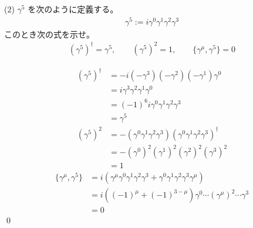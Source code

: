 \documentclass[uplatex,dvipdfmx,a4paper,11pt]{jlreq}
\makeatletter
\theoremstyle{definition}
\renewenvironment{proof}[1][\proofname]{\par
  \normalfont
  \topsep6\p@\@plus6\p@ \trivlist
  \item[\hskip\labelsep{\bfseries #1}\@addpunct{\bfseries}]\ignorespaces\quad\par
}{%
  \qed\endtrivlist\@endpefalse
}
\renewcommand\proofname{証明}
\makeatother
\begin{document}
(2) $\gamma^5$ を次のように定義する。
\begin{align}
  \gamma^5 := i\gamma^0\gamma^1\gamma^2\gamma^3
\end{align}
このとき次の式を示せ。
\begin{align}
  (\gamma^5)^\dagger = \gamma^5, \qquad (\gamma^5)^2 = 1, \qquad \lbrace\gamma^\mu, \gamma^5\rbrace = 0
\end{align}
\begin{proof}
  \begin{align}
    (\gamma^5)^\dagger & = -i(-\gamma^3)(-\gamma^2)(-\gamma^1)\gamma^0                                   \\
                       & = i\gamma^3\gamma^2\gamma^1\gamma^0                                             \\
                       & = (-1)^6i\gamma^0\gamma^1\gamma^2\gamma^3                                       \\
                       & = \gamma^5                                                                      \\
    (\gamma^5)^2       & = -(\gamma^0\gamma^1\gamma^2\gamma^3)(\gamma^0\gamma^1\gamma^2\gamma^3)^\dagger \\
                       & = - (\gamma^0)^2(\gamma^1)^2(\gamma^2)^2(\gamma^3)^2                            \\
                       & = 1
  \end{align}
  \begin{align}
    \lbrace\gamma^\mu, \gamma^5\rbrace & = i(\gamma^\mu\gamma^0\gamma^1\gamma^2\gamma^3 + \gamma^0\gamma^1\gamma^2\gamma^3\gamma^\mu) \\
                                       & = i((-1)^\mu + (-1)^{3-\mu})\gamma^0\cdots(\gamma^\mu)^2\cdots\gamma^3                       \\
                                       & = 0
  \end{align}
\end{proof}
\end{document}
